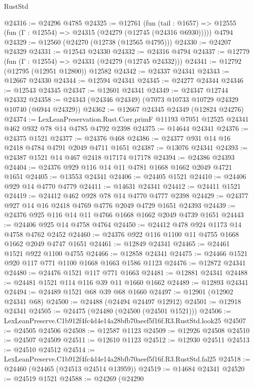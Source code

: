 \begin{lexlean}{RustStd}
\begin{coremodule}
@24316 := @24296 @4785
@24325 := @12761
    (fun (tail : @1657) => @12555 (fun (Γ : @12554) => @24315 (@24279 (@12745 (@24316 @6930)))))
    @4794
@24329 := @12560 (@24270 (@12738 (@12565 @4795)))
@24330 := @24207 @24329
@24331 := @12543 @24330
@24332 := @24316 @4794
@24337 := @12779 (fun (Γ : @12554) => @24331 (@24279 (@12745 @24332)))
@24341 := @12792 (@12795 (@12951 @12800)) @12582
@24342 := @24337 @24341
@24343 := @12667 @24330
@24344 := @12594 @24341
@24345 := @24277 @24344
@24346 := @12543 @24345
@24347 := @12601 @24341
@24349 := @24347 @12744 @24332
@24358 := @24343 (@24346 @24349) (@7073 @10733 @10729 @24329 @10740 (@6944 @24329))
@24362 := @12667 @24345 @24349 (@12824 @24276)
@24374 := LexLeanPreservation.Rust.Corr.primF
    @11193
    @7051
    @12525
    @24341
    @462
    @932
    @78
    @14
    @4785
    @4792
    @2398
@24375 := @14644 @24341
@24376 := @24375 @1521
@24377 := @24376 @468
@24386 := @24377 @931 @14 @16 @2418 @4784 @4791 @2049 @4711 @1651
@24387 := @13076 @24341
@24393 := @24387 @1521 @14 @467 @2418 @17174 @17178
@24394 := @24386 @24393
@24404 := @24376 @929 @116 @14 @11 @4781 @1668 @1662 @2049 @4721 @1651
@24405 := @13553 @24341
@24406 := @24405 @1521
@24410 := @24406 @929 @14 @4770 @4779
@24411 := @14631 @24341
@24412 := @24411 @1521
@24419 := @24412 @462 @928 @78 @14 @4770 @4777 @2398
@24429 := @24377 @927 @14 @16 @2418 @4769 @4776 @2049 @4729 @1651 @24393
@24439 := @24376 @925 @116 @14 @11 @4766 @1668 @1662 @2049 @4739 @1651
@24443 := @24406 @925 @14 @4758 @4764
@24450 := @24412 @478 @924 @1173 @14 @4758 @4762 @2452
@24460 := @24376 @922 @116 @1100 @11 @4755 @1668 @1662 @2049 @4747 @1651
@24461 := @12849 @24341
@24465 := @24461 @1521 @922 @1100 @4755
@24466 := @12858 @24341
@24475 := @24466 @1521 @920 @117 @771 @1100 @1668 @1663 @1586 @1123
@24476 := @12872 @24341
@24480 := @24476 @1521 @117 @771 @1663
@24481 := @12881 @24341
@24488 := @24481 @1521 @114 @116 @39 @11 @1660 @1662
@24489 := @12893 @24341
@24494 := @24489 @1521 @68 @39 @68 @1660
@24497 := @12901 (@12902 @24341 @68)
@24500 := @24488 (@24494 @24497 @12912)
@24501 := @12918 @24341
@24505 := @24475 (@24480 (@24500 (@24501 @1521)))
@24506 := LexLeanPreserve.C1b912f4fc4d4e14a28bfb70aeef5f16f.R3.RustStd.look25
@24507 := @24505 @24506
@24508 := @12587 @1123
@24509 := @12926 @24508
@24510 := @24507 @24509
@24511 := @12610 @1123
@24512 := @12930 @24511
@24513 := @24510 @24512
@24514 := LexLeanPreserve.C1b912f4fc4d4e14a28bfb70aeef5f16f.R3.RustStd.fal25
@24518 := @24460 (@24465 (@24513 @24514 @13959))
@24519 := @14684 @24341
@24520 := @24519 @1521
@24588 := @24269
    (@24290

\end{coremodule}
\end{lexlean}
